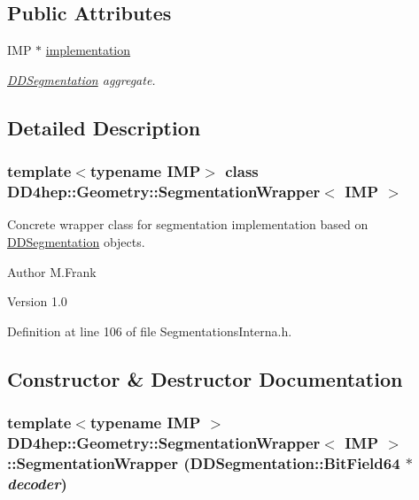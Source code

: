\subsection*{Public Attributes}
\begin{DoxyCompactItemize}
\item 
IMP $\ast$ \hyperlink{class_d_d4hep_1_1_geometry_1_1_segmentation_wrapper_a1f5c880ae30f25a0dd16cfd963aea926}{implementation}
\begin{DoxyCompactList}\small\item\em \hyperlink{namespace_d_d4hep_1_1_d_d_segmentation}{DDSegmentation} aggregate. \item\end{DoxyCompactList}\end{DoxyCompactItemize}


\subsection{Detailed Description}
\subsubsection*{template$<$typename IMP$>$ class DD4hep::Geometry::SegmentationWrapper$<$ IMP $>$}

Concrete wrapper class for segmentation implementation based on \hyperlink{namespace_d_d4hep_1_1_d_d_segmentation}{DDSegmentation} objects. \begin{DoxyAuthor}{Author}
M.Frank 
\end{DoxyAuthor}
\begin{DoxyVersion}{Version}
1.0 
\end{DoxyVersion}


Definition at line 106 of file SegmentationsInterna.h.

\subsection{Constructor \& Destructor Documentation}
\hypertarget{class_d_d4hep_1_1_geometry_1_1_segmentation_wrapper_a422a008dd4769304777684a719f5801f}{
\subsubsection[{SegmentationWrapper}]{\setlength{\rightskip}{0pt plus 5cm}template$<$typename IMP $>$ {\bf DD4hep::Geometry::SegmentationWrapper}$<$ IMP $>$::{\bf SegmentationWrapper} ({\bf DDSegmentation::BitField64} $\ast$ {\em decoder})}}
\label{class_d_d4hep_1_1_geometry_1_1_segmentation_wrapper_a422a008dd4769304777684a719f5801f}


